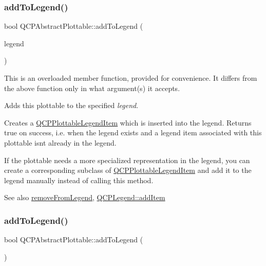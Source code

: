 \subsubsection{\texorpdfstring{add\+To\+Legend()}{addToLegend()}\hspace{0.1cm}{\footnotesize\ttfamily [1/2]}}
{\footnotesize\ttfamily bool Q\+C\+P\+Abstract\+Plottable\+::add\+To\+Legend (\begin{DoxyParamCaption}\item[{\hyperlink{class_q_c_p_legend}{Q\+C\+P\+Legend} $\ast$}]{legend }\end{DoxyParamCaption})}

This is an overloaded member function, provided for convenience. It differs from the above function only in what argument(s) it accepts.

Adds this plottable to the specified {\itshape legend}.

Creates a \hyperlink{class_q_c_p_plottable_legend_item}{Q\+C\+P\+Plottable\+Legend\+Item} which is inserted into the legend. Returns true on success, i.\+e. when the legend exists and a legend item associated with this plottable isn\textquotesingle{}t already in the legend.

If the plottable needs a more specialized representation in the legend, you can create a corresponding subclass of \hyperlink{class_q_c_p_plottable_legend_item}{Q\+C\+P\+Plottable\+Legend\+Item} and add it to the legend manually instead of calling this method.

\begin{DoxySeeAlso}{See also}
\hyperlink{class_q_c_p_abstract_plottable_a3cc235007e2343a65ad4f463767e0e20}{remove\+From\+Legend}, \hyperlink{class_q_c_p_legend_a3ab274de52d2951faea45a6d975e6b3f}{Q\+C\+P\+Legend\+::add\+Item} 
\end{DoxySeeAlso}
\mbox{\label{class_q_c_p_abstract_plottable_a70f8cabfd808f7d5204b9f18c45c13f5}} 
\subsubsection{\texorpdfstring{add\+To\+Legend()}{addToLegend()}\hspace{0.1cm}{\footnotesize\ttfamily [2/2]}}
{\footnotesize\ttfamily bool Q\+C\+P\+Abstract\+Plottable\+::add\+To\+Legend (\begin{DoxyParamCaption}{ }\end{DoxyParamCaption})}

